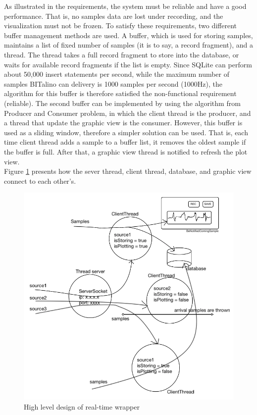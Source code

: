 As illustrated in the requirements, the system must be reliable and have a good performance. That is, no samples data are lost under recording, and the visualization must not be frozen. To satisfy these requirements, two different buffer management methods are used. A buffer, which is used for storing samples, maintains a list of fixed number of samples (it is to say, a record fragment), and a thread. The thread takes a full record fragment to store into the database, or waits for available record fragments if the list is empty. Since SQLite can perform about 50,000\cite{SQLITEORG_INSERT} insert statements per second, while the maximum number of samples BITalino can delivery is 1000 samples per second (1000Hz), the algorithm for this buffer is therefore satisfied the non-functional requirement (reliable). The second buffer can be implemented by using the algorithm from Producer and Consumer problem, in which the client thread is the producer, and a thread that update the graphic view is the consumer. However, this buffer is used as a sliding window, therefore a simpler solution can be used. That is, each time client thread adds a sample to a buffer list, it removes the oldest sample if the buffer is full. After that, a graphic view thread is notified to refresh the plot view.\\
Figure \ref{fig:Figures/ThreadsDBPlot} presents how the sever thread, client thread, database, and graphic view connect to each other’s.
\begin{figure}[ht]
    \centering
    \includegraphics[width=1.0\textwidth]{Figures/ThreadsDBPlot.png}
    \caption{High level design of real-time wrapper}
    \label{fig:Figures/ThreadsDBPlot}
\end{figure}
